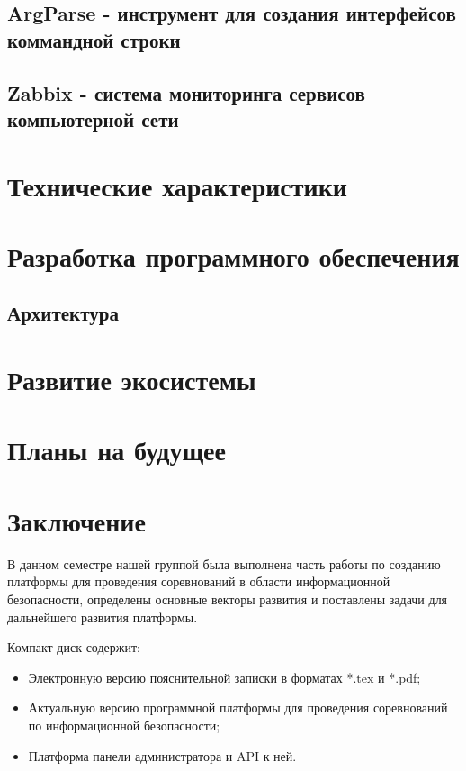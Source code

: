 \subsection{ArgParse - инструмент для создания интерфейсов коммандной строки}

\subsection{Zabbix - система мониторинга сервисов компьютерной сети}


\newpage
\section{Технические характеристики}


\section{Разработка программного обеспечения}
\setcounter{figure}{0}
 
\subsection{Архитектура}


\section{Развитие экосистемы}
\setcounter{figure}{0}
 


\newpage
\section{Планы на будущее}


\newpage
\section*{Заключение}
В данном семестре нашей группой была выполнена часть работы по созданию платформы для проведения соревнований в области информационной безопасности, определены основные векторы развития и поставлены задачи для дальнейшего развития платформы.

\newpage
\renewcommand{\refname}{Список использованных источников}


Компакт-диск содержит: 
\begin{itemize}
\item Электронную версию пояснительной записки в форматах *.tex и *.pdf;
\item Актуальную версию программной платформы для проведения соревнований по информационной безопасности;
\item Платформа панели администратора и API к ней.
\end{itemize}
 

